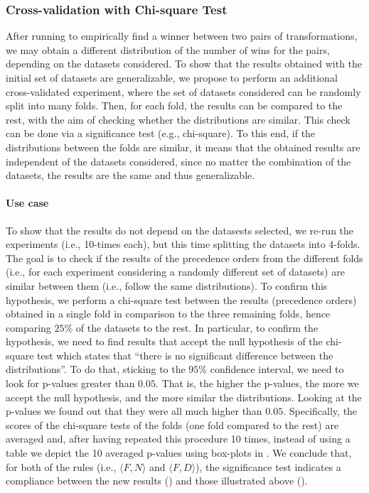 \subsubsection{Cross-validation with Chi-square Test}
\label{sec:learned-rules-validation}
After running  to empirically find a winner between two pairs of transformations, we may obtain a different distribution of the number of wins for the pairs, depending on the datasets considered.
To show that the results obtained with the initial set of datasets are generalizable, we propose to perform an additional cross-validated experiment, where the set of datasets considered can be randomly split into many folds.
Then, for each fold, the results can be compared to the rest, with the aim of checking whether the distributions are similar.
This check can be done via a significance test (e.g., chi-square).
To this end, if the distributions between the folds are similar, it means that the obtained results are independent of the datasets considered, since no matter the combination of the datasets, the results are the same and thus generalizable.

\paragraph{Use case} To show that the results do not depend on the datasests selected, we re-run the experiments (i.e., 10-times each), but this time splitting the datasets into 4-folds.
The goal is to check if the results of the precedence orders from the different folds (i.e., for each experiment considering a randomly different set of datasets) are similar between them (i.e., follow the same distributions).
To confirm this hypothesis, we perform a chi-square test between the results (precedence orders) obtained in a single fold in comparison to the three remaining folds, hence comparing $25$\% of the datasets to the rest.
In particular, to confirm the hypothesis, we need to find results that accept the null hypothesis of the chi-square test which states that ``there is no significant difference between the distributions''.
To do that, sticking to the $95$\% confidence interval, we need to look for p-values greater than $0.05$.
That is, the higher the p-values, the more we accept the null hypothesis, and the more similar the distributions.
Looking at the p-values we found out that they were all much higher than $0.05$.
Specifically, the scores of the chi-square tests of the folds (one fold compared to the rest) are averaged and, after having repeated this procedure 10 times, instead of using a table we depict the 10 averaged p-values using box-plots in .
We conclude that, for both of the rules (i.e.,  $\langle F, N \rangle$ and $\langle F, D \rangle$), the significance test indicates a compliance between the new results () and those illustrated above ().

